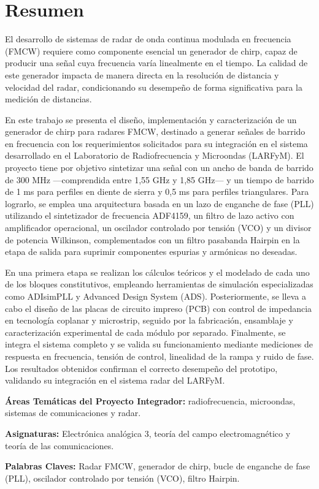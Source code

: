 \chapter*{Resumen} 

El desarrollo de sistemas de radar de onda continua modulada en frecuencia (FMCW) requiere como componente esencial un generador de chirp, capaz de producir una señal cuya frecuencia varía linealmente en el tiempo. La calidad de este generador impacta de manera directa en la resolución de distancia y velocidad del radar, condicionando su desempeño de forma significativa para la medición de distancias.

En este trabajo se presenta el diseño, implementación y caracterización de un generador de chirp para radares FMCW, destinado a generar señales de barrido en frecuencia con los requerimientos solicitados para su integración en el sistema desarrollado en el Laboratorio de Radiofrecuencia y Microondas (LARFyM). El proyecto tiene por objetivo sintetizar una señal con un ancho de banda de barrido de 300 MHz —comprendida entre 1,55 GHz y 1,85 GHz— y un tiempo de barrido de 1 ms para perfiles en diente de sierra y 0,5 ms para perfiles triangulares. Para lograrlo, se emplea una arquitectura basada en un lazo de enganche de fase (PLL) utilizando el sintetizador de frecuencia ADF4159, un filtro de lazo activo con amplificador operacional, un oscilador controlado por tensión (VCO) y un divisor de potencia Wilkinson, complementados con un filtro pasabanda Hairpin en la etapa de salida para suprimir componentes espurias y armónicas no deseadas.

En una primera etapa se realizan los cálculos teóricos y el modelado de cada uno de los bloques constitutivos, empleando herramientas de simulación especializadas como ADIsimPLL y Advanced Design System (ADS). Posteriormente, se lleva a cabo el diseño de las placas de circuito impreso (PCB) con control de impedancia en tecnología coplanar y microstrip, seguido por la fabricación, ensamblaje y caracterización experimental de cada módulo por separado. Finalmente, se integra el sistema completo y se valida su funcionamiento mediante mediciones de respuesta en frecuencia, tensión de control, linealidad de la rampa y ruido de fase. Los resultados obtenidos confirman el correcto desempeño del prototipo, validando su integración en el sistema radar del LARFyM.

\vspace{1em}
\noindent\textbf{Áreas Temáticas del Proyecto Integrador:} radiofrecuencia, microondas, sistemas de comunicaciones y radar.

\noindent\textbf{Asignaturas:} Electrónica analógica 3, teoría del campo electromagnético y teoría de las comunicaciones. 


\noindent\textbf{Palabras Claves:} Radar FMCW, generador de chirp, bucle de enganche de fase (PLL), oscilador controlado por tensión (VCO), filtro Hairpin.